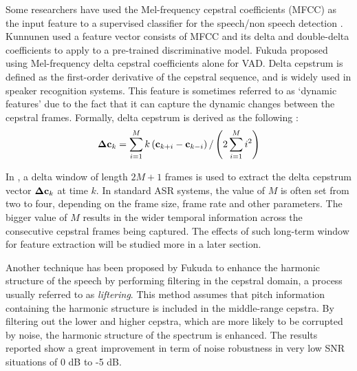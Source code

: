 Some researchers have used the Mel-frequency cepstral coefficients (MFCC) as the input feature to a supervised classifier for the speech/non speech detection \cite{kinnunen2007voice,martin2001robust,cho2011enhanced}.
Kunnunen \etal \cite{kinnunen2007voice} used a feature vector consists of MFCC and its delta and double-delta coefficients to apply to a pre-trained discriminative model.
Fukuda \etal \cite{fukuda2008phone} proposed using Mel-frequency delta cepstral coefficients alone for VAD.
Delta cepstrum is defined as the first-order derivative of the cepstral sequence, and is widely used in speaker recognition systems.
This feature is sometimes referred to as `dynamic features' due to the fact that it can capture the dynamic changes between the cepstral frames.
Formally, delta cepstrum is derived as the following \cite{fukuda2008phone}:
\begin{equation}\label{eq:delta_cepstrum}
	\mathbf{\Delta c}_k = \sum_{i=1}^M k \left( \mathbf{c}_{k+i} - \mathbf{c}_{k-i} \right) / \left(2\sum_{i=1}^M i^2 \right)
\end{equation}

In , a delta window of length $2M+1$ frames is used to extract the delta cepstrum vector $\mathbf{\Delta c}_k$ at time $k$.
In standard ASR systems, the value of $M$ is often set from two to four, depending on the frame size, frame rate and other parameters.
The bigger value of $M$ results in the wider temporal information across the consecutive cepstral frames being captured.
The effects of such long-term window for feature extraction will be studied more in a later section.

Another technique has been proposed by Fukuda \etal \cite{fukuda2010long} to enhance the harmonic structure of the speech by performing filtering in the cepstral domain, a process usually referred to as \emph{liftering}.
This method assumes that pitch information containing the harmonic structure is included in the middle-range cepstra.
By filtering out the lower and higher cepstra, which are more likely to be corrupted by noise, the harmonic structure of the spectrum is enhanced.
The results reported show a great improvement in term of noise robustness in very low SNR situations of 0 dB to -5 dB.

